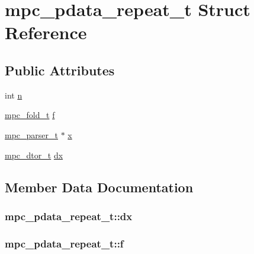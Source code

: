 \hypertarget{structmpc__pdata__repeat__t}{}\section{mpc\+\_\+pdata\+\_\+repeat\+\_\+t Struct Reference}
\label{structmpc__pdata__repeat__t}
\subsection*{Public Attributes}
\begin{DoxyCompactItemize}
\item 
int \hyperlink{structmpc__pdata__repeat__t_a1129e6a02594f81135b82703983adcd7}{n}
\item 
\hyperlink{mpc_8h_a3b403e2e723fa36cce1cc6dd30ebd26d}{mpc\+\_\+fold\+\_\+t} \hyperlink{structmpc__pdata__repeat__t_a90b15cdc09a383129e10841ce21c725e}{f}
\item 
\hyperlink{structmpc__parser__t}{mpc\+\_\+parser\+\_\+t} $\ast$ \hyperlink{structmpc__pdata__repeat__t_a6078512c08e14b36c0140794cde2b3cc}{x}
\item 
\hyperlink{mpc_8h_aa06bd80d555077ce004dc04a85d2b781}{mpc\+\_\+dtor\+\_\+t} \hyperlink{structmpc__pdata__repeat__t_aa17c7f4e5f246f5fda506f6462b9ef5d}{dx}
\end{DoxyCompactItemize}


\subsection{Member Data Documentation}
\hypertarget{structmpc__pdata__repeat__t_aa17c7f4e5f246f5fda506f6462b9ef5d}{}
\subsubsection[{dx}]{ mpc\+\_\+pdata\+\_\+repeat\+\_\+t\+::dx}\label{structmpc__pdata__repeat__t_aa17c7f4e5f246f5fda506f6462b9ef5d}
\hypertarget{structmpc__pdata__repeat__t_a90b15cdc09a383129e10841ce21c725e}{}
\subsubsection[{f}]{ mpc\+\_\+pdata\+\_\+repeat\+\_\+t\+::f}\label{structmpc__pdata__repeat__t_a90b15cdc09a383129e10841ce21c725e}
\hypertarget{structmpc__pdata__repeat__t_a1129e6a02594f81135b82703983adcd7}{}
